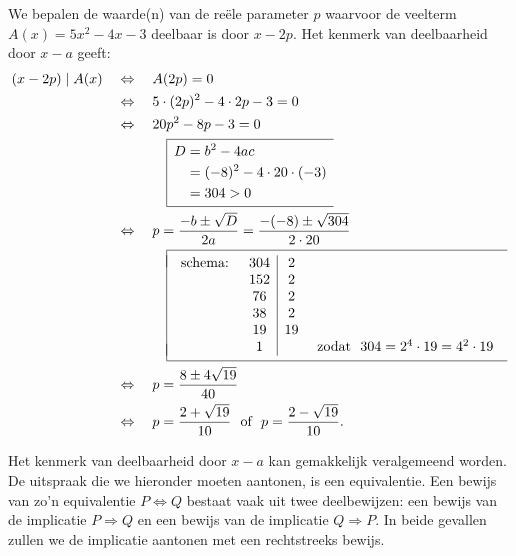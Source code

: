 \documentclass{ximera}
\begin{document}
	\begin{example} 
	We bepalen de waarde(n) van de re\"ele parameter $p$ waarvoor de veelterm $A(x) = 5x^2-4x-3$ deelbaar is door $x-2p$. Het kenmerk van deelbaarheid door $x-a$ geeft:
	\begin{align*}
	(x-2p) \mid A(x) \quad 
	& \Leftrightarrow \quad A(2p) = 0 \\
	& \Leftrightarrow \quad 5 \cdot (2p)^2 - 4 \cdot 2p - 3 = 0 \\
	& \Leftrightarrow \quad 20p^2 - 8p - 3 = 0 \\
	& \mph{\Leftrightarrow} \qquad 
	\begin{array}{|l}
	\hline
	\begin{aligned}
	\vrule height 0.4cm width 0cm
	D & = b^2-4ac \\[0.1cm]
	& = (-8)^2-4 \cdot 20 \cdot (-3) \\[0.1cm]
	& = 304 > 0 \\[0.1cm]
	\end{aligned} \\
	\hline
	\end{array} \\
	& \Leftrightarrow \quad p = \frac{-b \pm \sqrt{D}}{2a} = \frac{-(-8) \pm \sqrt{304}}{2 \cdot 20} \\
	& \mph{\Leftrightarrow} \qquad 
	\begin{array}{|l}
	\hline
	\mbox{} \\[-0.3cm]
	\begin{array}{lc|cr}
	\text{schema: } & 304 & 2 \\
	& 152 & 2 \\
	& 76 & 2 \\
	& 38 & 2 \\
	& 19 & 19 \\
	& 1 & & \text{ zodat } \,\, 304 = 2^4 \cdot 19 = 4^2 \cdot 19
	\end{array}\\[-0.3cm]
	\mbox{} \\
	\hline
	\end{array} \\
	& \Leftrightarrow \quad p = \frac{8 \pm 4\sqrt{19}}{40} \\
	& \Leftrightarrow \quad p = \frac{2 + \sqrt{19}}{10} \,\, \text{ of } \,\, p = \frac{2 - \sqrt{19}}{10}.
	\end{align*}
	\end{example} 
	
	Het kenmerk van deelbaarheid door $x-a$ kan gemakkelijk veralgemeend worden. De uitspraak die we hieronder moeten aantonen, is een equivalentie. Een bewijs van zo'n equivalentie $P \Leftrightarrow Q$ bestaat vaak uit twee deelbewijzen: een bewijs van de implicatie $P \Rightarrow Q$ en een bewijs van de implicatie $Q \Rightarrow P$. In beide gevallen zullen we de implicatie aantonen met een rechtstreeks bewijs.
	
\end{document}
